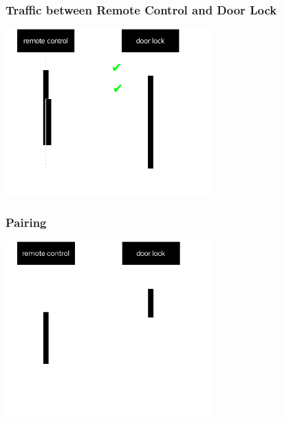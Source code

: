 \documentclass[aspectratio=169]{beamer}
\begin{document}
\begin{frame}
	\frametitle{Traffic between Remote Control and Door Lock}

	\begin{center}
		\includegraphics[width=0.6\textwidth]{communication2.pdf}
	\end{center}
\end{frame}

\begin{frame}
	\frametitle{Pairing}

	\begin{center}
		\includegraphics[width=0.6\textwidth]{pairing.pdf}
	\end{center}
\end{frame}
\end{document}
